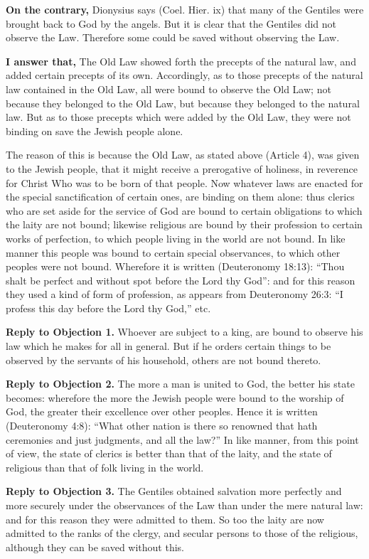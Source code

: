 \textbf{On the contrary,} Dionysius says (Coel. Hier. ix) that many of the Gentiles were brought back to God by the angels. But it is clear that the Gentiles did not observe the Law. Therefore some could be saved without observing the Law.

\textbf{I answer that,} The Old Law showed forth the precepts of the natural law, and added certain precepts of its own. Accordingly, as to those precepts of the natural law contained in the Old Law, all were bound to observe the Old Law; not because they belonged to the Old Law, but because they belonged to the natural law. But as to those precepts which were added by the Old Law, they were not binding on save the Jewish people alone.

The reason of this is because the Old Law, as stated above (Article 4), was given to the Jewish people, that it might receive a prerogative of holiness, in reverence for Christ Who was to be born of that people. Now whatever laws are enacted for the special sanctification of certain ones, are binding on them alone: thus clerics who are set aside for the service of God are bound to certain obligations to which the laity are not bound; likewise religious are bound by their profession to certain works of perfection, to which people living in the world are not bound. In like manner this people was bound to certain special observances, to which other peoples were not bound. Wherefore it is written (Deuteronomy 18:13): ``Thou shalt be perfect and without spot before the Lord thy God'': and for this reason they used a kind of form of profession, as appears from Deuteronomy 26:3: ``I profess this day before the Lord thy God,'' etc.

\textbf{Reply to Objection 1.} Whoever are subject to a king, are bound to observe his law which he makes for all in general. But if he orders certain things to be observed by the servants of his household, others are not bound thereto.

\textbf{Reply to Objection 2.} The more a man is united to God, the better his state becomes: wherefore the more the Jewish people were bound to the worship of God, the greater their excellence over other peoples. Hence it is written (Deuteronomy 4:8): ``What other nation is there so renowned that hath ceremonies and just judgments, and all the law?'' In like manner, from this point of view, the state of clerics is better than that of the laity, and the state of religious than that of folk living in the world.

\textbf{Reply to Objection 3.} The Gentiles obtained salvation more perfectly and more securely under the observances of the Law than under the mere natural law: and for this reason they were admitted to them. So too the laity are now admitted to the ranks of the clergy, and secular persons to those of the religious, although they can be saved without this.

